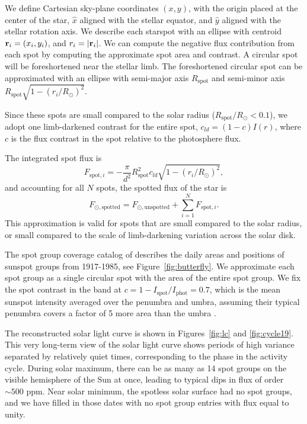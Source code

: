 We define Cartesian sky-plane coordinates $(x,y)$, with the origin placed at the center of the star, $\hat{x}$  aligned with the stellar equator, and $\hat{y}$ aligned with the stellar rotation axis. We describe each starspot with an ellipse with centroid ${\bf r}_i = (x_i, y_i)$, and $r_i = \vert {\bf r}_i \vert$.  We can compute the negative flux contribution from each spot by computing the approximate spot area and contrast. A circular spot will be foreshortened near the stellar limb. The foreshortened circular spot can be approximated with an ellipse with semi-major axis $R_{\mathrm{spot}}$ and semi-minor axis $R_{\mathrm{spot}} \sqrt{1 - (r_i/R_\odot)^2}$. 

Since these spots are small compared to the solar radius ($R_{\mathrm{spot}}/R_\odot < 0.1$), we adopt one limb-darkened contrast for the entire spot, $c_{ld} = (1-c) I(r)$, where $c$ is the flux contrast in the spot relative to the photosphere flux. 

The integrated spot flux is 
\begin{equation}
F_{\mathrm{spot}, i} = - \frac{\pi}{d^2} R_{\mathrm{spot}}^2 c_{ld} \sqrt{1 - (r_i/R_\odot)^2}, 
\end{equation}
and accounting for all $N$ spots, the spotted flux of the star is
\begin{equation}
F_{\odot, \mathrm{spotted}} = F_{\odot, \mathrm{unspotted}}  + \sum_{i=1}^{N} F_{\mathrm{spot}, i}.
\end{equation}
This approximation is valid for spots that are small compared to the solar radius, or small compared to the scale of limb-darkening variation across the solar disk.

The spot group coverage catalog of \citet{Howard1984} describes the daily areas and positions of sunspot groups from 1917-1985, see Figure~\ref{fig:butterfly}. We approximate each spot group as a single circular spot with the area of the entire spot group. We fix the spot contrast in the \kepler band at $c = 1 - I_\mathrm{spot}/I_\mathrm{phot} = 0.7$, which is the mean sunspot intensity averaged over the penumbra and umbra, assuming their typical penumbra covers a factor of 5 more area than the umbra \citep{Solanki2003}. 

The reconstructed solar light curve is shown in Figures~\ref{fig:lc} and \ref{fig:cycle19}. This very long-term view of the solar light curve shows periods of high variance separated by relatively quiet times, corresponding to the phase in the activity cycle. During solar maximum, there can be as many as 14 spot groups on the visible hemisphere of the Sun at once, leading to typical dips in flux of order $\sim 500$ ppm. Near solar minimum, the spotless solar surface had no spot groups, and we have filled in those dates with no spot group entries with flux equal to unity. 

